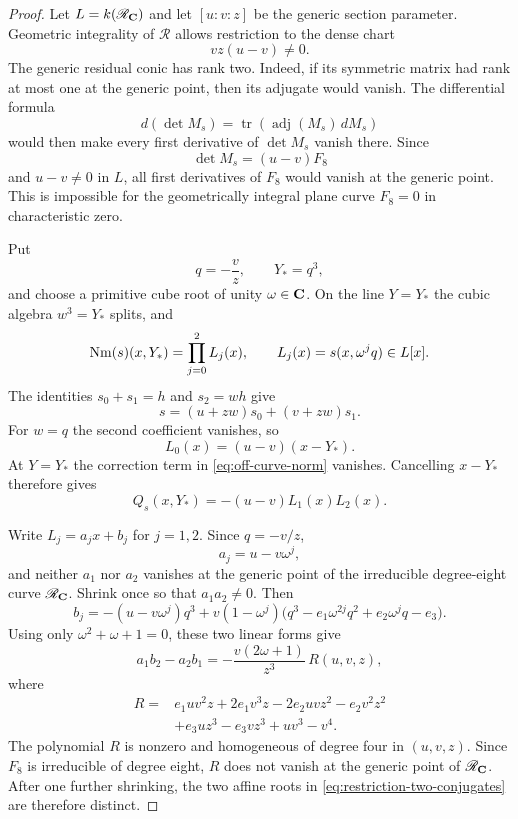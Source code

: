\begin{proof}
Let $L=k(\mathscr R_{\mathbf C})$ and let $[u:v:z]$ be the generic section
parameter.  Geometric integrality of $\mathscr R$ allows restriction to the
dense chart
\[
 vz(u-v)\ne0.
\]
The generic residual conic has rank two.  Indeed, if its symmetric matrix
had rank at most one at the generic point, then its adjugate would vanish.
The differential formula
\[
 d(\det M_s)=\operatorname{tr}(\operatorname{adj}(M_s)\,dM_s)
\]
would then make every first derivative of $\det M_s$ vanish there.  Since
\[
 \det M_s=(u-v)F_8
\]
and $u-v\ne0$ in $L$, all first derivatives of $F_8$ would vanish at the
generic point.  This is impossible for the geometrically integral plane
curve $F_8=0$ in characteristic zero.

Put
\[
 q=-\frac vz,\qquad Y_*=q^3,
\]
and choose a primitive cube root of unity $\omega\in\mathbf C$.  On the line
$Y=Y_*$ the cubic algebra $w^3=Y_*$ splits, and
\[
 \operatorname{Nm}(s)(x,Y_*)=\prod_{j=0}^2 L_j(x),
 \qquad
 L_j(x)=s(x,\omega^jq)\in L[x].
\]
The identities $s_0+s_1=h$ and $s_2=wh$ give
\[
 s=(u+zw)s_0+(v+zw)s_1.
\]
For $w=q$ the second coefficient vanishes, so
\[
 L_0(x)=(u-v)(x-Y_*).
\]
At $Y=Y_*$ the correction term in \eqref{eq:off-curve-norm} vanishes.
Cancelling $x-Y_*$ therefore gives
\begin{equation}
 Q_s(x,Y_*)=-(u-v)L_1(x)L_2(x).
\label{eq:restriction-two-conjugates}
\end{equation}

Write $L_j=a_jx+b_j$ for $j=1,2$.  Since $q=-v/z$,
\[
 a_j=u-v\omega^j,
\]
and neither $a_1$ nor $a_2$ vanishes at the generic point of the
irreducible degree-eight curve $\mathscr R_{\mathbf C}$.  Shrink once so that
$a_1a_2\ne0$.  Then
\[
 b_j=-(u-v\omega^j)q^3
     +v(1-\omega^j)
       \bigl(q^3-e_1\omega^{2j}q^2+e_2\omega^jq-e_3\bigr).
\]
Using only $\omega^2+\omega+1=0$, these two linear forms give
\begin{equation}
 a_1b_2-a_2b_1
 =-\frac{v(2\omega+1)}{z^3}\,R(u,v,z),
\label{eq:conjugate-root-separation}
\end{equation}
where
\begin{align*}
R={}&e_1uv^2z+2e_1v^3z-2e_2uvz^2-e_2v^2z^2\\
 &+e_3uz^3-e_3vz^3+uv^3-v^4.
\end{align*}
The polynomial $R$ is nonzero and homogeneous of degree four in $(u,v,z)$.
Since $F_8$ is irreducible of degree eight, $R$ does not vanish at the
generic point of $\mathscr R_{\mathbf C}$.  After one further shrinking, the two
affine roots in \eqref{eq:restriction-two-conjugates} are therefore distinct.


\end{proof}
